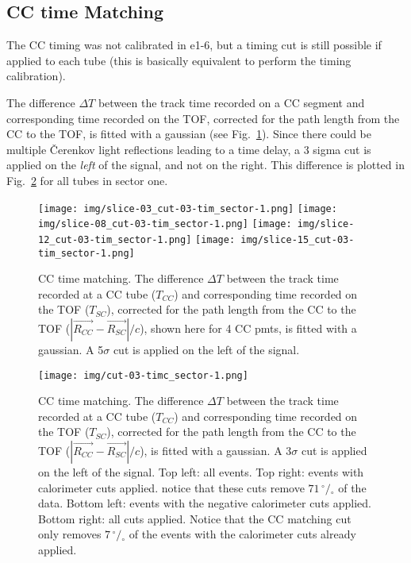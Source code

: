 \clearpage\newpage

\subsection{CC time Matching}
The CC timing was not calibrated in e1-6, but a timing cut is still possible if applied to each tube
(this is basically equivalent to perform the timing calibration).

The difference $\Delta T$ between the track time recorded on a CC segment and corresponding time recorded on the TOF,
corrected for the path length from the CC to the TOF, is fitted with a gaussian (see Fig.~\ref{fig:cc_time_slices}).
Since there could be multiple \v Cerenkov light reflections leading to a time delay,
a 3 sigma cut is applied on the {\it left} of the signal, and not on the right.
This difference is plotted in Fig.~\ref{fig:cc_time_sec1} for all tubes in sector one.

\begin{figure}[ht]
  \centering
		\texttt{[image: img/slice-03\_cut-03-tim\_sector-1.png]}
		\texttt{[image: img/slice-08\_cut-03-tim\_sector-1.png]}
		\texttt{[image: img/slice-12\_cut-03-tim\_sector-1.png]}
		\texttt{[image: img/slice-15\_cut-03-tim\_sector-1.png]}
		\caption{CC time matching. The difference $\Delta T$ between the track time recorded
               at a CC tube ($T_{CC}$) and corresponding time recorded on the TOF ($T_{SC}$),
               corrected for the path length from the CC to the TOF ($|\vec{R_{CC}}-\vec{R_{SC}}|/c$),
               shown here for 4 CC pmts, is fitted with a gaussian.
               A 5$\sigma$ cut is applied on the left of the signal.}
 		\label{fig:cc_time_slices}
\end{figure}

\begin{figure}[ht]
  \centering
		\texttt{[image: img/cut-03-timc\_sector-1.png]}
		\caption{CC time matching. The difference $\Delta T$ between the track time recorded
               at a CC tube ($T_{CC}$) and corresponding time recorded on the TOF ($T_{SC}$),
               corrected for the path length from the CC to the TOF ($|\vec{R_{CC}}-\vec{R_{SC}}|/c$),
               is fitted with a gaussian. A 3$\sigma$ cut is applied on the left of the signal.
               Top left: all events. Top right: events with calorimeter cuts applied.
               notice that these cuts remove $71 \,^{\circ\!\!}/\!_\circ$ of the data.
               Bottom left: events with the negative calorimeter cuts applied.
               Bottom right: all cuts applied. Notice that the CC matching cut
               only removes $7  \,^{\circ\!\!}/\!_\circ$ of the events with
               the calorimeter cuts already applied.}
 		\label{fig:cc_time_sec1}
\end{figure}

